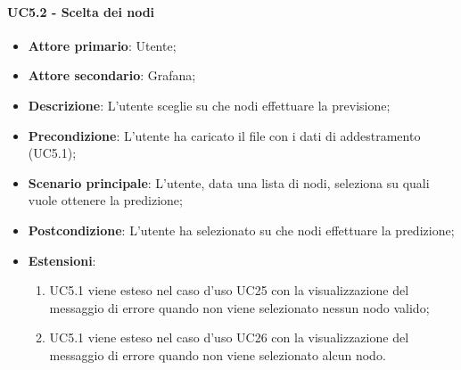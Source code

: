 \paragraph{UC5.2 - Scelta dei nodi}
\label{para:uc5.2}
\begin{itemize}
  \item \textbf{Attore primario}: Utente;
  \item \textbf{Attore secondario}: Grafana;
  \item \textbf{Descrizione}: L'utente sceglie su che nodi effettuare la previsione;
  \item \textbf{Precondizione}: L'utente ha caricato il file con i dati di addestramento (UC5.1);
  \item \textbf{Scenario principale}: L'utente, data una lista di nodi, seleziona su quali vuole ottenere la predizione;
  \item \textbf{Postcondizione}: L'utente ha selezionato su che nodi effettuare la predizione;
  \item \textbf{Estensioni}:
  \begin{enumerate}
    \item UC5.1 viene esteso nel caso d'uso UC25 con la visualizzazione del messaggio di errore quando non viene selezionato nessun nodo valido;
    \item UC5.1 viene esteso nel caso d'uso UC26 con la visualizzazione del messaggio di errore quando non viene selezionato alcun nodo.
    \end{enumerate}
\end{itemize}


